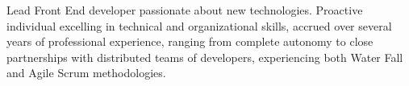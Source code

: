 

\begin{cvparagraph}

Lead Front End developer passionate about new technologies. Proactive individual excelling in technical and organizational skills, accrued over several years of professional experience, ranging from complete autonomy to close partnerships with distributed teams of developers, experiencing both Water Fall and Agile Scrum methodologies.
\end{cvparagraph}
